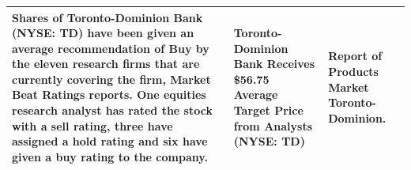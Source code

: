 \begin{center}
\begin{table}[!htb]
\begin{tabular}{|l|l|l|}
\begin{minipage}[t]{0.4\columnwidth}%
Shares of Toronto-Dominion Bank (NYSE: TD) have been given an average recommendation of Buy by the eleven research firms that are currently covering the firm, Market Beat Ratings reports. One equities research analyst has rated the stock with a sell rating, three have assigned a hold rating and six have given a buy rating to the company.           
\end{minipage}
 & 
\begin{minipage}[t]{0.3\columnwidth}%
Toronto-Dominion Bank Receives \$56.75 Average Target Price from Analysts (NYSE: TD) 
\end{minipage}
 & 
\begin{minipage}[t]{0.3\columnwidth}%
Report of Products Market Toronto-Dominion. 
\end{minipage}  \\ \hline


\end{tabular}
\end{table}
\end{center}


